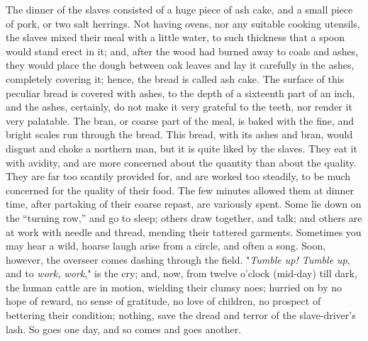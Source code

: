 The dinner of the slaves consisted of a huge piece of ash cake, and a
small piece of pork, or two salt
{\protect\hypertarget{104}{}{}}herrings. Not having ovens, nor any
suitable cooking utensils, the slaves mixed their meal with a little
water, to such thickness that a spoon would stand erect in it; and,
after the wood had burned away to coals and ashes, they would place the
dough between oak leaves and lay it carefully in the ashes, completely
covering it; hence, the bread is called ash cake. The surface of this
peculiar bread is covered with ashes, to the depth of a sixteenth part
of an inch, and the ashes, certainly, do not make it very grateful to
the teeth, nor render it very palatable. The bran, or coarse part of the
meal, is baked with the fine, and bright scales run through the bread.
This bread, with its ashes and bran, would disgust and choke a northern
man, but it is quite liked by the slaves. They eat it with avidity, and
are more concerned about the quantity than about the quality. They are
far too scantily provided for, and are worked too steadily, to be much
concerned for the quality of their food. The few minutes allowed them at
dinner time, after partaking of their coarse repast, are variously
spent. Some lie down on the ``turning row,'' and go to sleep; others
draw together, and talk; and others are at work with needle and thread,
mending their tattered garments. Sometimes you may hear a wild, hoarse
laugh arise from a circle, and often a song. Soon, however, the overseer
comes dashing through the field. "\emph{Tumble up! Tumble up}, and to
\emph{work, work}," is the cry; and, now, from twelve o'clock (mid-day)
till dark, the human cattle are in motion, wielding their clumsy noes;
hurried on by no hope of reward, no sense of gratitude, no love of
children, no prospect of bettering {\protect\hypertarget{105}{}{}}their
condition; nothing, save the dread and terror of the slave-driver's
lash. So goes one day, and so comes and goes another.

